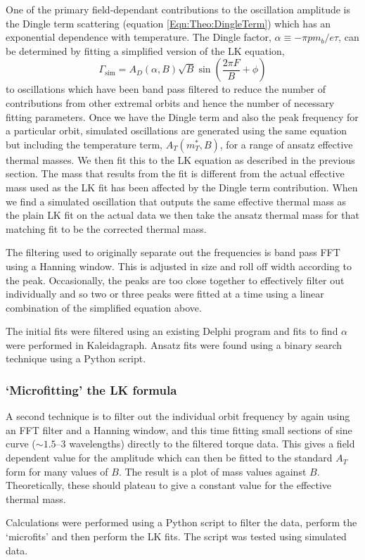 One of the primary field-dependant contributions to the oscillation amplitude is the Dingle term scattering (equation \ref{Eqn:Theo:DingleTerm}) which has an exponential dependence with temperature. The Dingle factor, $\alpha \equiv -\pi p m_b/e\tau$, can be determined by fitting a simplified version of the \ac{LK} equation,
\begin{equation}
    \Gamma_{\textrm{sim}} =  A_D(\alpha, B) \sqrt{B} \sin{\left(\frac{2\pi F}{B} + \phi \right)}
\end{equation}
 to oscillations which have been band pass filtered to reduce the number of contributions from other extremal orbits and hence the number of necessary fitting parameters. Once we have the Dingle term and also the peak frequency for a particular orbit, simulated oscillations are generated using the same equation but including the temperature term, $A_T(m^*_T, B)$, for a range of ansatz effective thermal masses. We then fit this to the \ac{LK} equation as described in the previous section. The mass that results from the fit is different from the actual effective mass used as the \ac{LK} fit has been affected by the Dingle term contribution. When we find a simulated oscillation that outputs the same effective thermal mass as the plain \ac{LK} fit on the actual data we then take the ansatz thermal mass for that matching fit to be the corrected thermal mass.

The filtering used to originally separate out the frequencies is band pass \ac{FFT} using a Hanning window.  This is adjusted in size and roll off width according to the peak. Occasionally, the peaks are too close together to effectively filter out individually and so two or three peaks were fitted at a time using a linear combination of the simplified equation above.

The initial fits were filtered using an existing Delphi program and fits to find $\alpha$ were performed in Kaleidagraph. Ansatz fits were found using a binary search technique using a Python script.


\subsubsection{`Microfitting' the \ac{LK} formula}
\label{Sec:Exp:LKMicrofitting}

A second technique is to filter out the individual orbit frequency by again using an \ac{FFT} filter and a Hanning window, and this time fitting small sections of sine curve ($\sim 1.5$--$3$ wavelengths) directly to the filtered torque data. This gives a field dependent value for the amplitude which can then be fitted to the standard $A_T$ form for many values of $B$. The result is a plot of mass values against $B$. Theoretically, these should plateau to give a constant value for the effective thermal mass.

Calculations were performed using a Python script to filter the data, perform the `microfits' and then perform the \ac{LK} fits. The script was tested using simulated data.


